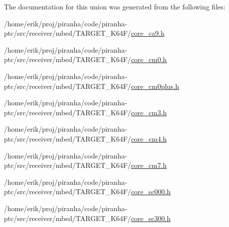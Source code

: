 The documentation for this union was generated from the following files\+:\begin{DoxyCompactItemize}
\item 
/home/erik/proj/piranha/code/piranha-\/ptc/src/receiver/mbed/\+T\+A\+R\+G\+E\+T\+\_\+\+K64\+F/\hyperlink{core__ca9_8h}{core\+\_\+ca9.\+h}\item 
/home/erik/proj/piranha/code/piranha-\/ptc/src/receiver/mbed/\+T\+A\+R\+G\+E\+T\+\_\+\+K64\+F/\hyperlink{core__cm0_8h}{core\+\_\+cm0.\+h}\item 
/home/erik/proj/piranha/code/piranha-\/ptc/src/receiver/mbed/\+T\+A\+R\+G\+E\+T\+\_\+\+K64\+F/\hyperlink{core__cm0plus_8h}{core\+\_\+cm0plus.\+h}\item 
/home/erik/proj/piranha/code/piranha-\/ptc/src/receiver/mbed/\+T\+A\+R\+G\+E\+T\+\_\+\+K64\+F/\hyperlink{core__cm3_8h}{core\+\_\+cm3.\+h}\item 
/home/erik/proj/piranha/code/piranha-\/ptc/src/receiver/mbed/\+T\+A\+R\+G\+E\+T\+\_\+\+K64\+F/\hyperlink{core__cm4_8h}{core\+\_\+cm4.\+h}\item 
/home/erik/proj/piranha/code/piranha-\/ptc/src/receiver/mbed/\+T\+A\+R\+G\+E\+T\+\_\+\+K64\+F/\hyperlink{core__cm7_8h}{core\+\_\+cm7.\+h}\item 
/home/erik/proj/piranha/code/piranha-\/ptc/src/receiver/mbed/\+T\+A\+R\+G\+E\+T\+\_\+\+K64\+F/\hyperlink{core__sc000_8h}{core\+\_\+sc000.\+h}\item 
/home/erik/proj/piranha/code/piranha-\/ptc/src/receiver/mbed/\+T\+A\+R\+G\+E\+T\+\_\+\+K64\+F/\hyperlink{core__sc300_8h}{core\+\_\+sc300.\+h}\end{DoxyCompactItemize}
